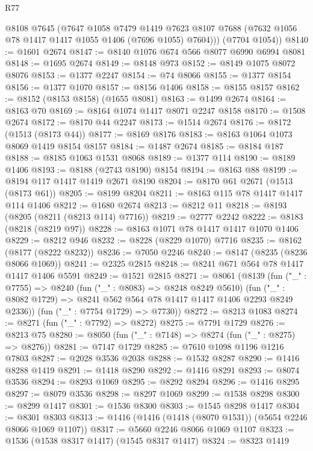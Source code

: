 \begin{lexlean}{R77}
\begin{coremodule}
{{        @8108
        @7645
        (@7647
          @1058
          @7479
          @1419
          @7623
          @8107
          @7688
          (@7632 @1056 @78 @1417 @1417 @1055 @1406 (@7696 @1055) @7604)))
      (@7704 @1054))
@8140 := @1601 @2674
@8147 := @8140 @1076 @674 @566 @8077 @6990 @6994 @8081
@8148 := @1695 @2674
@8149 := @8148 @973
@8152 := @8149 @1075 @8072 @8076
@8153 := @1377 @2247
@8154 := @74 @8066
@8155 := @1377 @8154
@8156 := @1377 @1070
@8157 := @8156 @1406
@8158 := @8155 @8157
@8162 := @8152 (@8153 @8158) (@1655 @8081)
@8163 := @1499 @2674
@8164 := @8163 @70
@8169 := @8164 @1074 @1417 @8071 @2247 @8158
@8170 := @1508 @2674
@8172 := @8170 @44 @2247
@8173 := @1514 @2674
@8176 := @8172 (@1513 (@8173 @44))
@8177 := @8169 @8176
@8183 := @8163 @1064 @1073 @8069 @1419 @8154 @8157
@8184 := @1487 @2674
@8185 := @8184 @187
@8188 := @8185 @1063 @1531 @8068
@8189 := @1377 @114
@8190 := @8189 @1406
@8193 := @8188 (@2743 @8190) @8154
@8194 := @8163 @88
@8199 := @8194 @117 @1417 @1419 @2671 @8190
@8204 := @8170 @61 @2671 (@1513 (@8173 @61))
@8205 := @8199 @8204
@8211 := @8163 @115 @78 @1417 @1417 @114 @1406
@8212 := @1680 @2674
@8213 := @8212 @11
@8218 := @8193 (@8205 (@8211 (@8213 @114) @7716))
@8219 := @2777 @2242
@8222 := @8183 (@8218 (@8219 @97))
@8228 := @8163 @1071 @78 @1417 @1417 @1070 @1406
@8229 := @8212 @946
@8232 := @8228 (@8229 @1070) @7716
@8235 := @8162 (@8177 (@8222 @8232))
@8236 := @7050 @2246
@8240 := @8147 (@8235 (@8236 @8066 @1069))
@8241 := @2325 @2815
@8248 := @8241 @671 @564 @78 @1417 @1417 @1406 @5591
@8249 := @1521 @2815
@8271 := @8061
    (@8139
      (fun ("_" : @7755) =>
      @8240
        (fun ("_" : @8083) => @8248 @8249 @5610)
        (fun ("_" : @8082 @1729) => @8241 @562 @564 @78 @1417 @1417 @1406 @2293 @8249 @2336))
      (fun ("_" : @7754 @1729) => @7730))
@8272 := @8213 @1083
@8274 := @8271 (fun ("_" : @7792) => @8272)
@8275 := @7791 @1729
@8276 := @8213 @75
@8280 := @8050 (fun ("_" : @7148) => @8274 (fun ("_" : @8275) => @8276))
@8281 := @7147 @1729
@8285 := @7610 @1098 @1196 @1216 @7803
@8287 := @2028 @3536 @2038
@8288 := @1532 @8287
@8290 := @1416 @8288 @1419
@8291 := @1418 @8290
@8292 := @1416 @8291
@8293 := @8074 @3536
@8294 := @8293 @1069
@8295 := @8292 @8294
@8296 := @1416 @8295
@8297 := @8079 @3536
@8298 := @8297 @1069
@8299 := @1538 @8298
@8300 := @8299 @1417
@8301 := @1536 @8300
@8303 := @1545 @8298 @1417
@8304 := @8301 @8303
@8313 := @1416 (@1416 (@1418 (@8070 @1531)) (@5654 @2246 @8066 @1069 @1107))
@8317 := @5660 @2246 @8066 @1069 @1107
@8323 := @1536 (@1538 @8317 @1417) (@1545 @8317 @1417)
@8324 := @8323 @1419
}}
\end{coremodule}
\end{lexlean}

